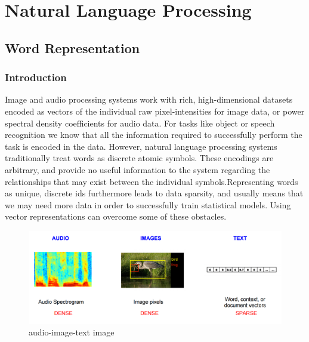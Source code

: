 \chapter{Natural Language Processing}%
\label{chap:chap3}
\section{Word Representation}
\label{chap:Word Representation}

  \subsection{Introduction}

Image and audio processing systems work with rich, high-dimensional datasets encoded as vectors of the individual raw pixel-intensities for image data, or power spectral density coefficients for audio data. For tasks like object or speech recognition we know that all the information required to successfully perform the task is encoded in the data. However, natural language processing systems traditionally treat words as discrete atomic symbols. These encodings are arbitrary, and provide no useful information to the system regarding the relationships that may exist between the individual symbols.Representing words as unique, discrete ids furthermore leads to data sparsity, and usually means that we may need more data in order to successfully train statistical models. Using vector representations can overcome some of these obstacles\cite{web003}\@.
  
 \begin{figure}[H]%
    \center%
    \includegraphics[width=1\textwidth]{images/amira/audio-image-text.png}%
    \caption[This is audio-image-text image]{audio-image-text image}\label{fig:audio-image-text}%
 \end{figure}
 
